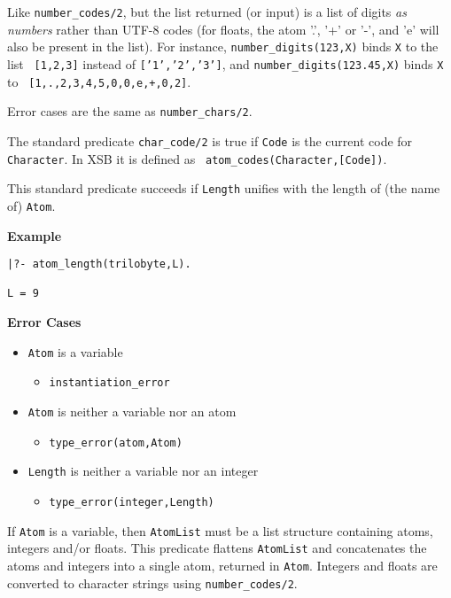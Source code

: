 \begin{description}
Like \verb|number_codes/2|, but the list returned (or input) is a list
of digits \emph{as numbers} rather than UTF-8 codes (for floats, the
atom '.', '+' or '-', and 'e' will also be present in the list). For
instance, \verb|number_digits(123,X)| binds {\tt X} to the list {\tt
  [1,2,3]} instead of {\tt ['1','2','3']}, and
\verb|number_digits(123.45,X)| binds {\tt X} to {\tt
  [1,.,2,3,4,5,0,0,e,+,0,2]}.

Error cases are the same as {\tt number\_chars/2}.

%
The standard predicate {\tt char\_code/2} is true if {\tt Code} is the
current code for {\tt Character}.  In XSB it is defined as {\tt
  atom\_codes(Character,[Code])}.

%
This standard predicate succeeds if {\tt Length} unifies with the
length of (the name of) {\tt Atom}.

{\bf Example}
{\small
\begin{verbatim}
|?- atom_length(trilobyte,L).

L = 9
\end{verbatim}
}

{\bf Error Cases}
\begin{itemize}
  \item {\tt Atom} is a variable
\begin{itemize}
\item {\tt instantiation\_error}
\end{itemize}
\item {\tt Atom} is neither a variable nor an atom
\begin{itemize}      
\item   {\tt type\_error(atom,Atom)}
\end{itemize}
\item {\tt Length} is neither a variable nor an integer
\begin{itemize}      
\item   {\tt type\_error(integer,Length)}
\end{itemize}
\end{itemize}

%
If {\tt Atom} is a variable, then
{\tt AtomList} must be a list structure containing atoms, integers
and/or floats.  This predicate flattens {\tt AtomList} and
concatenates the atoms and integers into a single atom, returned in
{\tt Atom}.  Integers and floats are converted to character strings
using {\tt number\_codes/2}.


\end{description}
